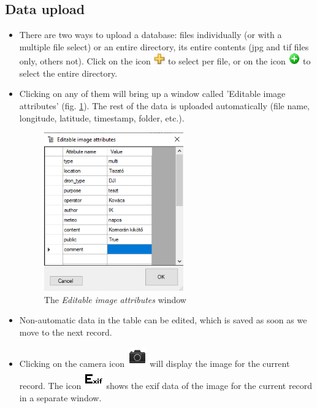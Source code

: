 \documentclass[a4paper,12pt]{article}
\begin{document}
\subsection{Data upload }

\begin{itemize}
	\item There are two ways to upload a database: files individually (or with a multiple file select) or an entire directory, its entire contents (jpg and tif files only, others not). Click on the icon \includegraphics [width = 0.5cm] {plus.png} to select per file, or on the icon \includegraphics [width = 0.5cm] {addfolder.png} to select the entire directory.
	
	\item Clicking on any of them will bring up a window called 'Editable image attributes' (fig. \ref{fig:editableimageattribute}). The rest of the data is uploaded automatically (file name, longitude, latitude, timestamp, folder, etc.). 
	
	\begin{figure}
		\centering
		\includegraphics[width=6cm]{editableimageattributes.png}
		\caption{The \textit{Editable image attributes} window}
		\label{fig:editableimageattribute}
	\end{figure}
	
	\item Non-automatic data in the table can be edited, which is saved as soon as we move to the next record. 
	
	\item Clicking on the camera icon \includegraphics [width = 0.5 cm] {camera.png} will display the image for the current record. The icon \includegraphics [width = 0.6 cm] {exif.png} shows the exif data of the image for the current record in a separate window. 
\end{itemize}
\end{document}
